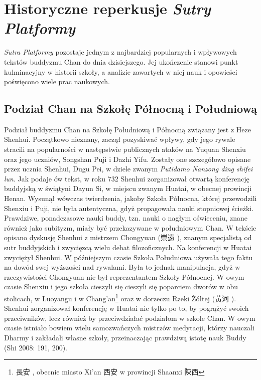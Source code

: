 \chapter{Historyczne reperkusje \textit{Sutry Platformy}}
\label{ch:chapter_four}
\textit{Sutra Platformy} pozostaje jednym z najbardziej popularnych i wpływowych tekstów buddyzmu Chan do dnia dzisiejszego. Jej ukończenie stanowi punkt kulminacyjny w historii szkoły, a analizie zawartych w niej nauk i opowieści poświęcono wiele prac naukowych.

\section{Podział Chan na Szkołę Północną i Południową}
Podział buddyzmu Chan na Szkołę Południową i Północną związany jest z Heze Shenhui.
Początkowo nieznany, zaczął pozyskiwać wpływy, gdy jego rywale stracili na popularności w następstwie publicznych ataków na Yuquan Shenxiu oraz jego uczniów, Songshan Puji i Dazhi Yifu.
Zostały one szczegółowo opisane przez ucznia Shenhui, Dugu Pei, w dziele zwanym \textit{Putidamo Nanzong ding shifei lun}. %
Jak podaje ów tekst, w roku 732 Shenhui zorganizował otwartą konferencję buddyjską w świątyni Dayun Si, w miejscu zwanym Huatai, w obecnej prowincji Henan.\label{Huatai}
Wysunął wówczas twierdzenia, jakoby Szkoła Północna, której przewodzili Shenxiu i Puji, nie była autentyczna, gdyż propagowała nauki stopniowej ścieżki.
Prawdziwe, ponadczasowe nauki buddy, tzn. nauki o nagłym oświeceniu, znane również jako subityzm, miały być przekazywane w południowym Chan.
W tekście opisano dyskusję Shenhui z mistrzem Chongyuan (崇遠 ), znanym specjalistą od sutr buddyjskich i zwycięzcą wielu debat filozoficznych.
Na konferencji w Huatai zwyciężył Shenhui.
W późniejszym czasie Szkoła Południowa używała tego faktu na dowód swej wyższości nad rywalami.
Była to jednak manipulacja, gdyż w rzeczywistości Chongyuan nie był reprezentantem Szkoły Północnej.
W owym czasie Shenxiu i jego szkoła cieszyli się cieszyli się poparciem dworów w obu stolicach, w Luoyangu i w Chang'an\footnote{長安 , obecnie miasto Xi'an 西安  w prowincji Shaanxi 陝西 } oraz w dorzeczu Rzeki Żółtej (黃河 ).
Shenhui zorganizował konferencję w Huatai nie tylko po to, by pogrążyć swoich przeciwników, lecz również by przeciwdziałać podziałom w szkole Chan.
W owym czasie istniało bowiem wielu samozwańczych mistrzów medytacji, którzy nauczali Dharmy i zakładali własne szkoły, przeinaczając prawdziwą istotę nauk Buddy
(Shi 2008: 191, 200).

